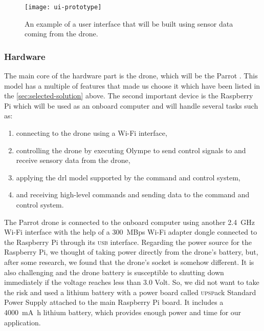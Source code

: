 \documentclass[../main.tex]{subfiles}
\begin{document}
\begin{figure}[bp]
    \centering
    \texttt{[image: ui-prototype]}
    \caption{An example of a user interface that will be built
                using sensor data coming from the \anafi drone.}
    \label{fig:ui-prototype}
\end{figure}

\subsubsection{Hardware}
The main core of the hardware part is the drone, 
which will be the Parrot \anafi. This model 
has a multiple of features that made us choose it 
which have been listed in the 
\cref{sec:selected-solution} above. 
The second important device is the Raspberry Pi 
which will be used as an onboard computer and will 
handle several tasks such as:

\begin{enumerate}
    \item connecting to the drone 
        using a Wi-Fi interface,
    \item controlling the drone 
        by executing Olympe to send control signals 
        to and receive sensory data from the drone,
    \item applying the \gls{drl} model supported by 
        the command and control system,
    \item and receiving high-level commands and 
        sending data to the command and control system.
\end{enumerate}
 
The Parrot \anafi drone is connected 
to the onboard computer using another 
\SI{2.4}{\giga\hertz}
Wi-Fi interface with the help of a 
\SI[per-mode=symbol,per-symbol=p]{300}{MBps} 
Wi-Fi adapter dongle connected to 
the Raspberry Pi through its \textsc{usb} interface. 
Regarding the power source for the Raspberry Pi, 
we thought of taking power directly from the 
drone's battery, but, after some research, we found 
that the \anafi drone's  
socket is somehow different. It is also challenging 
and the drone battery is susceptible to shutting down 
immediately if the voltage reaches less than 3.0 Volt. 
So, we did not want to take the risk and used a 
lithium battery with a power board called 
\textsc{upsp}ack Standard Power Supply attached to 
the main Raspberry Pi board. It includes a 
\SI{4000}{\milli\ampere\hour}
lithium battery, which provides enough power 
and time for our application.
\end{document}
